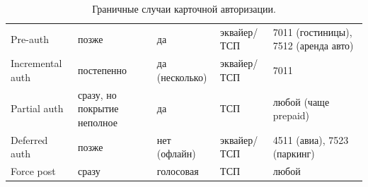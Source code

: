\begin{table}[H]
  \begingroup
  \small
  \setlength{\tabcolsep}{4pt}
  \renewcommand{\arraystretch}{1.2}
  \begin{tabularx}{\textwidth}{
      @{}B{0.14\textwidth}
      P{0.17\textwidth}
      P{0.15\textwidth}
      P{0.17\textwidth}
      Y@{}
    }
    \toprule
    \headrow
     &  &
     &  &
     \\
    \midrule
    Pre-auth & позже & да
    & эквайер/ТСП & 7011 (гостиницы), 7512 (аренда авто) \\
    Incremental auth & постепенно & да (несколько)
    & эквайер/ТСП & 7011 \\
    Partial auth & сразу, но покрытие неполное & да
    & ТСП & любой (чаще prepaid) \\
    Deferred auth & позже & нет (офлайн)
    & эквайер/ТСП & 4511 (авиа), 7523 (паркинг) \\
    Force post & сразу & голосовая
    & ТСП & любой \\
    \bottomrule
  \end{tabularx}%
  \endgroup
  \caption{Граничные случаи карточной авторизации.}\label{fig:tx-edge-cases}
\end{table}
